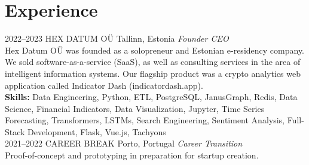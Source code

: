 \documentclass{friggeri-cv}
\begin{document}

\section{Experience}

\begin{entrylist}
\entry
{2022--2023}
{HEX DATUM OÜ}
{Tallinn, Estonia}
{\emph{Founder CEO}\\[-.5em]

Hex Datum OÜ was founded as a solopreneur and Estonian e-residency company. We sold software-as-a-service (SaaS), as well as consulting services in the area of intelligent information systems. Our flagship product was a crypto analytics web application called Indicator Dash (indicatordash.app).\\

{\small \textbf{Skills:} Data Engineering, Python, ETL, PostgreSQL, JanusGraph, \mbox{Redis}, Data Science, Financial Indicators, Data Visualization, Jupyter, Time Series Forecasting, Transformers, LSTMs, Search Engineering, Sentiment Analysis, Full-Stack \mbox{Development}, Flask, Vue.js, Tachyons}\\}
\entry
{2021--2022}
{CAREER BREAK}
{Porto, Portugal}
{\emph{Career Transition}\\[-.5em]

Proof-of-concept and prototyping in preparation for startup creation.\\}
\end{entrylist}
\end{document}

